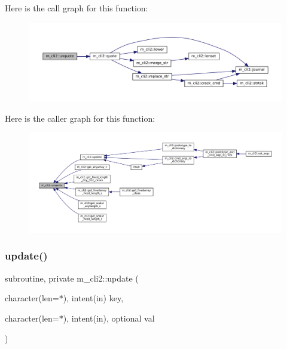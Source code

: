 Here is the call graph for this function\+:\nopagebreak
\begin{figure}[H]
\begin{center}
\leavevmode
\includegraphics[width=350pt]{namespacem__cli2_a9cab7352414f8b5625330a9ff5cf0cb4_cgraph}
\end{center}
\end{figure}
Here is the caller graph for this function\+:\nopagebreak
\begin{figure}[H]
\begin{center}
\leavevmode
\includegraphics[width=350pt]{namespacem__cli2_a9cab7352414f8b5625330a9ff5cf0cb4_icgraph}
\end{center}
\end{figure}
\mbox{\label{namespacem__cli2_a160d56bc4a10faef7e8a8a4f04f4dadb}} 
\subsubsection{\texorpdfstring{update()}{update()}}
{\footnotesize\ttfamily subroutine, private m\+\_\+cli2\+::update (\begin{DoxyParamCaption}\item[{character(len=$\ast$), intent(in)}]{key,  }\item[{character(len=$\ast$), intent(in), optional}]{val }\end{DoxyParamCaption})\hspace{0.3cm}{\ttfamily [private]}}



